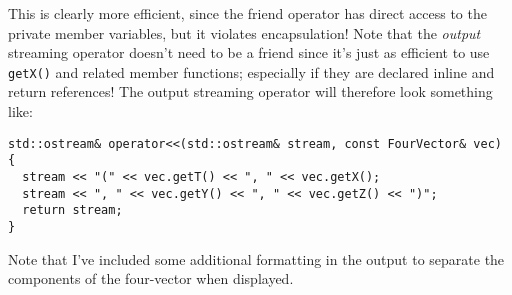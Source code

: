 \documentclass[a4paper]{scrartcl}
\begin{document}
This is clearly more efficient, since the friend operator has direct access to the private member variables, but it violates encapsulation! Note that the \emph{output} streaming operator doesn't need to be a friend since it's just as efficient to use \verb|getX()| and related member functions; especially if they are declared inline and return references! The output streaming operator will therefore look something like:

\begin{verbatim}
std::ostream& operator<<(std::ostream& stream, const FourVector& vec)
{
  stream << "(" << vec.getT() << ", " << vec.getX();
  stream << ", " << vec.getY() << ", " << vec.getZ() << ")";
  return stream;
}
\end{verbatim}

Note that I've included some additional formatting in the output to separate the components of the four-vector when displayed.


\end{document}
